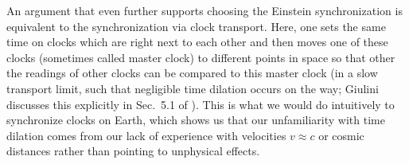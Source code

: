 \documentclass[../relativity_main.tex]{subfiles}
\begin{document}
An argument that even further supports choosing the Einstein synchronization is equivalent to the synchronization via clock transport. Here, one sets the same time on clocks which are right next to each other and then moves one of these clocks (sometimes called master clock) to different points in space so that other the readings of other clocks can be compared to this master clock (in a slow transport limit, such that negligible time dilation occurs on the way; Giulini discusses this explicitly in Sec.~5.1 of \cite{giulini_srt}). This is what we would do intuitively to synchronize clocks on Earth, which shows us that our unfamiliarity with time dilation comes from our lack of experience with velocities $v \approx c$ or cosmic distances rather than pointing to unphysical effects.\\


\end{document}
